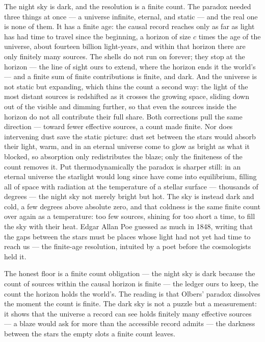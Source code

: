 The night sky is dark, and the resolution is a finite count. The paradox needed three things at once --- a
universe infinite, eternal, and static --- and the real one is none of them. It has a finite age: the causal
record reaches only as far as light has had time to travel since the beginning, a horizon of size $c$ times the
age of the universe, about fourteen billion light-years, and within that horizon there are only finitely many
sources. The shells do not run on forever; they stop at the horizon --- the line of sight ours to extend, where
the horizon ends it the world's --- and a finite sum of finite contributions is finite, and dark. And the
universe is not static but expanding, which thins the count a second way: the
light of the most distant sources is redshifted as it crosses the growing space, sliding down out of the
visible and dimming further, so that even the sources inside the horizon do not all contribute their full
share. Both corrections pull the same direction --- toward fewer effective sources, a count made finite. Nor
does intervening dust save the static picture: dust set between the stars would absorb their light, warm, and
in an eternal universe come to glow as bright as what it blocked, so absorption only redistributes the blaze;
only the finiteness of the count removes it. Put thermodynamically the paradox is sharper still: in an eternal
universe the starlight would long since have come into equilibrium, filling all of space with radiation at the
temperature of a stellar surface --- thousands of degrees --- the night sky not merely bright but hot. The sky
is instead dark and cold, a few degrees above absolute zero, and that coldness is the same finite count over
again as a temperature: too few sources, shining for too short a time, to fill the sky with their heat. Edgar Allan Poe
guessed as much in 1848, writing that the gaps
between the stars must be places whose light had not yet had time to reach us --- the finite-age resolution,
intuited by a poet before the cosmologists held it.

The honest floor is a finite count obligation --- the night sky is dark because the count of sources within the
causal horizon is finite --- the ledger ours to keep, the count the horizon holds the world's. The reading is
that Olbers' paradox dissolves the moment the count is finite. The dark sky is not a puzzle but a measurement:
it shows that the universe a record can see holds finitely many effective sources --- a blaze would
ask for more than the accessible record admits --- the darkness between the stars the empty slots a finite
count leaves.

